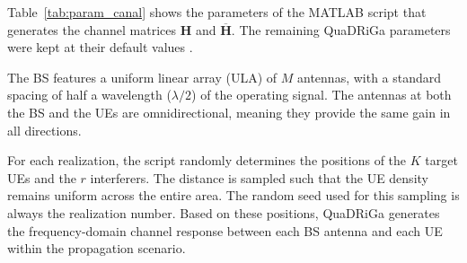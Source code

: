 Table~\ref{tab:param_canal} shows the parameters of the MATLAB script that generates the channel matrices $\mathbf{H}$ and $\overline{\mathbf{H}}$. The remaining QuaDRiGa parameters were kept at their default values \cite{quadriga-manual}.

The BS features a uniform linear array (ULA) of $M$ antennas, with a standard spacing of half a wavelength ($\lambda/2$) of the operating signal. The antennas at both the BS and the UEs are omnidirectional, meaning they provide the same gain in all directions.

For each realization, the script randomly determines the positions of the $K$ target UEs and the $r$ interferers. The distance is sampled such that the UE density remains uniform across the entire area. The random seed used for this sampling is always the realization number. Based on these positions, QuaDRiGa generates the frequency-domain channel response between each BS antenna and each UE within the propagation scenario.



